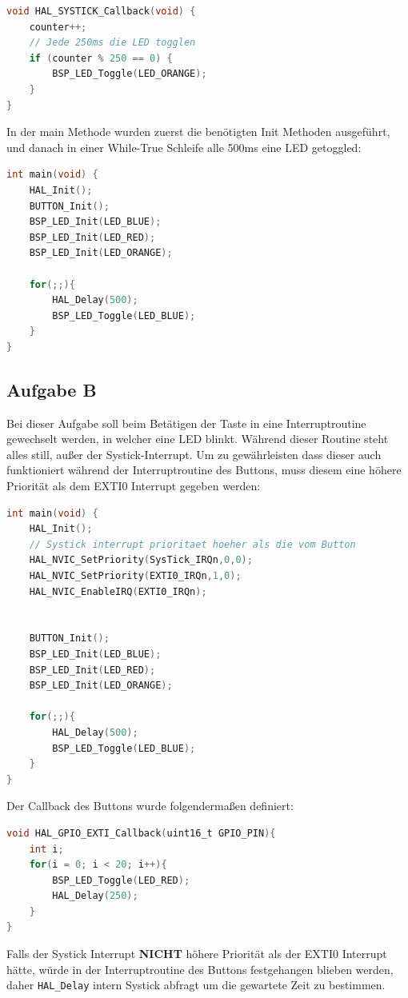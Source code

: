 \begin{lstlisting}[language=C]
void HAL_SYSTICK_Callback(void) {
	counter++;
	// Jede 250ms die LED togglen
	if (counter % 250 == 0) {
		BSP_LED_Toggle(LED_ORANGE);
	}
}
\end{lstlisting}

In der main Methode wurden zuerst die benötigten Init Methoden ausgeführt, und danach in einer While-True Schleife alle 500ms eine LED getoggled:

\begin{lstlisting}[language=C]
int main(void) {
	HAL_Init();
	BUTTON_Init();
	BSP_LED_Init(LED_BLUE);
	BSP_LED_Init(LED_RED);
	BSP_LED_Init(LED_ORANGE);
	
	for(;;){
		HAL_Delay(500);
		BSP_LED_Toggle(LED_BLUE);
	}
}
\end{lstlisting}
\subsection{Aufgabe B}
Bei dieser Aufgabe soll beim Betätigen der Taste in eine Interruptroutine gewechselt werden, in welcher eine LED blinkt. Während dieser Routine steht alles still, außer der Systick-Interrupt. Um zu gewährleisten dass dieser auch funktioniert während der Interruptroutine des Buttons, muss diesem eine höhere Priorität als dem EXTI0 Interrupt gegeben werden:

\begin{lstlisting}[language=C]
int main(void) {
	HAL_Init();
	// Systick interrupt prioritaet hoeher als die vom Button
	HAL_NVIC_SetPriority(SysTick_IRQn,0,0);
	HAL_NVIC_SetPriority(EXTI0_IRQn,1,0);
	HAL_NVIC_EnableIRQ(EXTI0_IRQn);
	
	
	BUTTON_Init();
	BSP_LED_Init(LED_BLUE);
	BSP_LED_Init(LED_RED);
	BSP_LED_Init(LED_ORANGE);
	
	for(;;){
		HAL_Delay(500);
		BSP_LED_Toggle(LED_BLUE);
	}
}
\end{lstlisting}

Der Callback des Buttons wurde folgendermaßen definiert:

\begin{lstlisting}[language=C]
void HAL_GPIO_EXTI_Callback(uint16_t GPIO_PIN){
	int i;
	for(i = 0; i < 20; i++){
		BSP_LED_Toggle(LED_RED);
		HAL_Delay(250);
	}
}
\end{lstlisting}

Falls der Systick Interrupt \textbf{NICHT} höhere Priorität als der EXTI0 Interrupt hätte, würde in der Interruptroutine des Buttons festgehangen blieben werden, daher \verb|HAL_Delay| intern Systick abfragt um die gewartete Zeit zu bestimmen.

